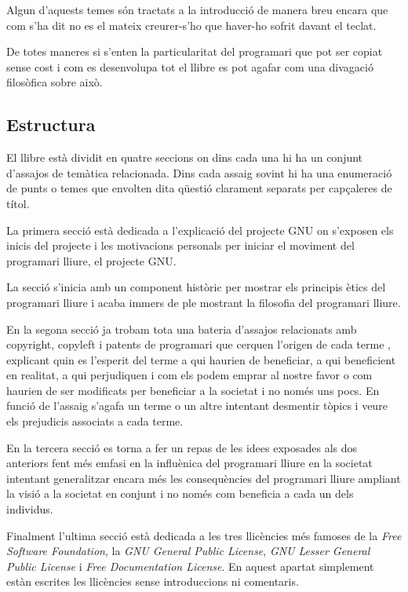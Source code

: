 \documentclass[a4paper,11pt]{scrartcl}
\begin{document}
Algun d'aquests temes són tractats a la introducció de manera breu encara
que com s'ha dit no es el mateix creurer-s'ho que haver-ho sofrit davant el teclat.

De totes maneres si s'enten la particularitat del programari que pot ser copiat sense
cost i com es desenvolupa tot el llibre es pot agafar com una divagació filosòfica
sobre això.

  \subsection{Estructura}

El llibre està dividit en quatre seccions on dins cada una hi ha un conjunt d'assajos
de temàtica relacionada. Dins cada assaig sovint hi ha una enumeració de punts o temes
que envolten dita qüestió clarament separats per capçaleres de títol.

La primera secció està dedicada a l'explicació del projecte GNU on s'exposen
els inicis del projecte i les motivacions personals per iniciar el moviment del
programari lliure, el projecte GNU.

La secció s'inicia amb un component històric per mostrar
els principis ètics del programari lliure i acaba immers de ple mostrant la
filosofia del programari lliure.

En la segona secció ja trobam tota una bateria d'assajos relacionats amb
copyright, copyleft i patents de programari que cerquen l'origen de cada terme
, explicant quin es l'esperit del terme a qui haurien de beneficiar, a qui
beneficient en realitat, a qui perjudiquen i com els podem emprar
al nostre favor o com haurien de ser modificats per beneficiar a la
societat i no només uns pocs. En funció de l'assaig s'agafa un terme o un altre
intentant desmentir tòpics i veure els prejudicis associats a cada terme.

En la tercera secció es torna a fer un repas de les idees exposades
als dos anteriors fent més emfasi en la influènica del programari
lliure en la societat intentant generalitzar encara més les
consequències del programari lliure ampliant la visió a la societat
en conjunt i no només com beneficia a cada un dels individus.

Finalment l'ultima secció està dedicada a les tres llicències més famoses
de la \emph{Free Software Foundation}, la \emph{GNU General Public License},
\emph{GNU Lesser General Public License} i \emph{Free Documentation License}.
En aquest apartat simplement estàn escrites les llicències sense introduccions ni comentaris.
\end{document}
